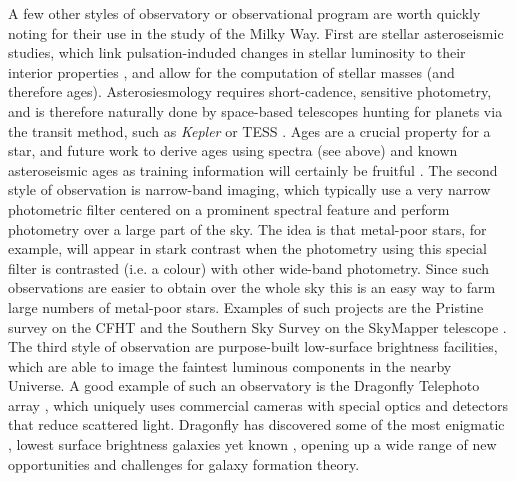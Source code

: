 A few other styles of observatory or observational program are worth quickly noting for their use in the study of the Milky Way. First are stellar asteroseismic studies, which link pulsation-induded changes in stellar luminosity to their interior properties \parencite[see][for a review]{kurtz22}, and allow for the computation of stellar masses (and therefore ages). Asterosiesmology requires short-cadence, sensitive photometry, and is therefore naturally done by space-based telescopes hunting for planets via the transit method, such as \textit{Kepler} \parencite{kepler} or TESS \parencite{tess}. Ages are a crucial property for a star, and future work to derive ages using spectra (see above) and known asteroseismic ages as training information will certainly be fruitful \parencite[e.g. see][]{montalban21}. The second style of observation is narrow-band imaging, which typically use a very narrow photometric filter centered on a prominent spectral feature and perform photometry over a large part of the sky. The idea is that metal-poor stars, for example, will appear in stark contrast when the photometry using this special filter is contrasted (i.e. a colour) with other wide-band photometry. Since such observations are easier to obtain over the whole sky this is an easy way to farm large numbers of metal-poor stars. Examples of such projects are the Pristine survey on the CFHT \parencite{pristine} and the Southern Sky Survey on the SkyMapper telescope \parencite{skymapperdr1}. The third style of observation are purpose-built low-surface brightness facilities, which are able to image the faintest luminous components in the nearby Universe. A good example of such an observatory is the Dragonfly Telephoto array \parencite{dragonfly}, which uniquely uses commercial cameras with special optics and detectors that reduce scattered light. Dragonfly has discovered some of the most enigmatic \parencite[i.e. both lacking, and being completely dominated by dark matter][]{vandokkum16,vandokkum18}, lowest surface brightness galaxies yet known \parencite{vandokkum15}, opening up a wide range of new opportunities and challenges for galaxy formation theory.

